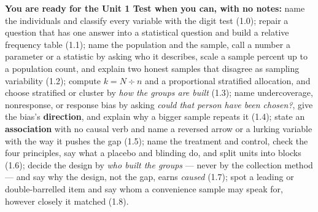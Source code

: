 \documentclass[10pt]{article}
\begin{document}
\vspace{6pt}
\boxguard[16]
\begin{remindbox}
\small
\textbf{You are ready for the Unit 1 Test when you can, with no notes:}
name the individuals and classify every variable with the digit test (1.0);
repair a question that has one answer into a statistical question and build a relative
frequency table (1.1);
name the population and the sample, call a number a parameter or a statistic by asking who it
describes, scale a sample percent up to a population count, and explain two honest samples
that disagree as sampling variability (1.2);
compute $k = N \div n$ and a proportional stratified allocation, and choose stratified or
cluster by \emph{how the groups are built} (1.3);
name undercoverage, nonresponse, or response bias by asking \emph{could that person have been
chosen?}, give the bias's \textbf{direction}, and explain why a bigger sample repeats it (1.4);
state an \textbf{association} with no causal verb and name a reversed arrow or a lurking
variable with the way it pushes the gap (1.5);
name the treatment and control, check the four principles, say what a placebo and blinding do,
and split units into blocks (1.6);
decide the design by \emph{who built the groups} --- never by the collection method --- and say
why the design, not the gap, earns \emph{caused} (1.7);
spot a leading or double-barrelled item and say whom a convenience sample may speak for, however
closely it matched (1.8).
\end{remindbox}
\end{document}
